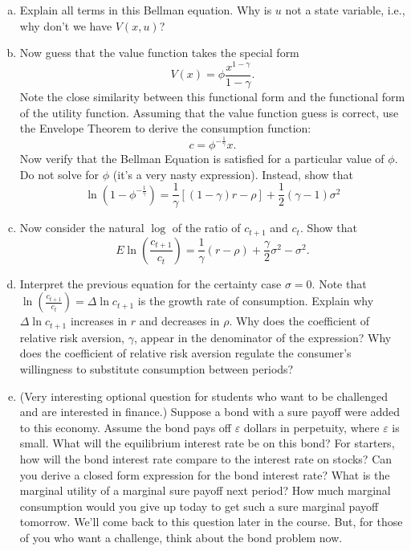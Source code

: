 \documentclass[11pt]{extarticle}
\theoremstyle{plain}
\theoremstyle{definition}
\begin{document}
\begin{enumerate}[(a)]
\item Explain all terms in this Bellman equation. Why is $u$ not a state variable, i.e., why don't we have $V(x, u)$?


\item Now guess that the value function takes the special form
$$
V(x)=\phi \frac{x^{1-\gamma}}{1-\gamma} .
$$
Note the close similarity between this functional form and the functional form of the utility function. Assuming that the value function guess is correct, use the Envelope Theorem to derive the consumption function:
$$
c=\phi^{-\frac{1}{\gamma}} x .
$$
Now verify that the Bellman Equation is satisfied for a particular value of $\phi$. Do not solve for $\phi$ (it's a very nasty expression). Instead, show that
$$
\ln \left(1-\phi^{-\frac{1}{\gamma}}\right)=\frac{1}{\gamma}[(1-\gamma) r-\rho]+\frac{1}{2}(\gamma-1) \sigma^2
$$


\item Now consider the natural $\log$ of the ratio of $c_{t+1}$ and $c_t$. Show that
$$
E \ln \left(\frac{c_{t+1}}{c_t}\right)=\frac{1}{\gamma}(r-\rho)+\frac{\gamma}{2} \sigma^2-\sigma^2 .
$$
\item Interpret the previous equation for the certainty case $\sigma=0$. Note that $\ln \left(\frac{c_{t+1}}{c_t}\right)=\Delta \ln c_{t+1}$ is the growth rate of consumption. Explain why $\Delta \ln c_{t+1}$ increases in $r$ and decreases in $\rho$. Why does the coefficient of relative risk aversion, $\gamma$, appear in the denominator of the expression? Why does the coefficient of relative risk aversion regulate the consumer's willingness to substitute consumption between periods?
\item (Very interesting optional question for students who want to be challenged and are interested in finance.) Suppose a bond with a sure payoff were added to this economy. Assume the bond pays off $\varepsilon$ dollars in perpetuity, where $\varepsilon$ is small. What will the equilibrium interest rate be on this bond? For starters, how will the bond interest rate compare to the interest rate on stocks? Can you derive a closed form expression for the bond interest rate? What is the marginal utility of a marginal sure payoff next period? How much marginal consumption would you give up today to get such a sure marginal payoff tomorrow. We'll come back to this question later in the course. But, for those of you who want a challenge, think about the bond problem now.

\end{enumerate}
\end{document}
